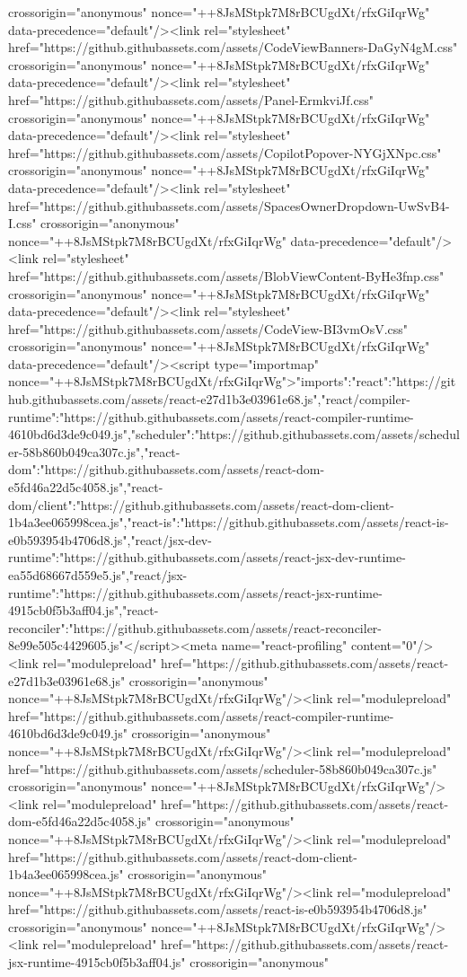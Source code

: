 crossorigin="anonymous" nonce="++8JsMStpk7M8rBCUgdXt/rfxGiIqrWg" data-precedence="default"/><link rel="stylesheet" href="https://github.githubassets.com/assets/CodeViewBanners-DaGyN4gM.css" crossorigin="anonymous" nonce="++8JsMStpk7M8rBCUgdXt/rfxGiIqrWg" data-precedence="default"/><link rel="stylesheet" href="https://github.githubassets.com/assets/Panel-ErmkviJf.css" crossorigin="anonymous" nonce="++8JsMStpk7M8rBCUgdXt/rfxGiIqrWg" data-precedence="default"/><link rel="stylesheet" href="https://github.githubassets.com/assets/CopilotPopover-NYGjXNpc.css" crossorigin="anonymous" nonce="++8JsMStpk7M8rBCUgdXt/rfxGiIqrWg" data-precedence="default"/><link rel="stylesheet" href="https://github.githubassets.com/assets/SpacesOwnerDropdown-UwSvB4-I.css" crossorigin="anonymous" nonce="++8JsMStpk7M8rBCUgdXt/rfxGiIqrWg" data-precedence="default"/><link rel="stylesheet" href="https://github.githubassets.com/assets/BlobViewContent-ByHe3fnp.css" crossorigin="anonymous" nonce="++8JsMStpk7M8rBCUgdXt/rfxGiIqrWg" data-precedence="default"/><link rel="stylesheet" href="https://github.githubassets.com/assets/CodeView-BI3vmOsV.css" crossorigin="anonymous" nonce="++8JsMStpk7M8rBCUgdXt/rfxGiIqrWg" data-precedence="default"/><script type="importmap" nonce="++8JsMStpk7M8rBCUgdXt/rfxGiIqrWg">{"imports":{"react":"https://github.githubassets.com/assets/react-e27d1b3e03961e68.js","react/compiler-runtime":"https://github.githubassets.com/assets/react-compiler-runtime-4610bd6d3de9c049.js","scheduler":"https://github.githubassets.com/assets/scheduler-58b860b049ca307c.js","react-dom":"https://github.githubassets.com/assets/react-dom-e5fd46a22d5c4058.js","react-dom/client":"https://github.githubassets.com/assets/react-dom-client-1b4a3ee065998cea.js","react-is":"https://github.githubassets.com/assets/react-is-e0b593954b4706d8.js","react/jsx-dev-runtime":"https://github.githubassets.com/assets/react-jsx-dev-runtime-ea55d68667d559e5.js","react/jsx-runtime":"https://github.githubassets.com/assets/react-jsx-runtime-4915cb0f5b3aff04.js","react-reconciler":"https://github.githubassets.com/assets/react-reconciler-8e99e505c4429605.js"}}</script><meta name="react-profiling" content="0"/><link rel="modulepreload" href="https://github.githubassets.com/assets/react-e27d1b3e03961e68.js" crossorigin="anonymous" nonce="++8JsMStpk7M8rBCUgdXt/rfxGiIqrWg"/><link rel="modulepreload" href="https://github.githubassets.com/assets/react-compiler-runtime-4610bd6d3de9c049.js" crossorigin="anonymous" nonce="++8JsMStpk7M8rBCUgdXt/rfxGiIqrWg"/><link rel="modulepreload" href="https://github.githubassets.com/assets/scheduler-58b860b049ca307c.js" crossorigin="anonymous" nonce="++8JsMStpk7M8rBCUgdXt/rfxGiIqrWg"/><link rel="modulepreload" href="https://github.githubassets.com/assets/react-dom-e5fd46a22d5c4058.js" crossorigin="anonymous" nonce="++8JsMStpk7M8rBCUgdXt/rfxGiIqrWg"/><link rel="modulepreload" href="https://github.githubassets.com/assets/react-dom-client-1b4a3ee065998cea.js" crossorigin="anonymous" nonce="++8JsMStpk7M8rBCUgdXt/rfxGiIqrWg"/><link rel="modulepreload" href="https://github.githubassets.com/assets/react-is-e0b593954b4706d8.js" crossorigin="anonymous" nonce="++8JsMStpk7M8rBCUgdXt/rfxGiIqrWg"/><link rel="modulepreload" href="https://github.githubassets.com/assets/react-jsx-runtime-4915cb0f5b3aff04.js" crossorigin="anonymous" 